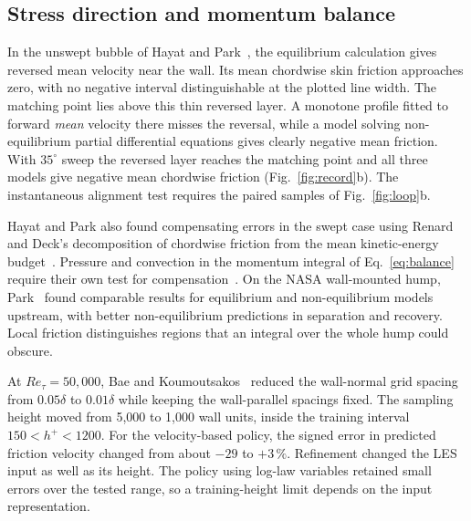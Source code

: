 \documentclass[pdflatex,sn-nature,iicol]{sn-jnl}
\begin{document}
\subsection{Stress direction and momentum balance}
In the unswept bubble of Hayat and Park~\cite{Hayat2024preprint,HayatPark2025}, the equilibrium calculation gives reversed mean velocity near the wall. Its mean chordwise skin friction approaches zero, with no negative interval distinguishable at the plotted line width. The matching point lies above this thin reversed layer. A monotone profile fitted to forward \emph{mean} velocity there misses the reversal, while a model solving non-equilibrium partial differential equations gives clearly negative mean friction. With $35^\circ$ sweep the reversed layer reaches the matching point and all three models give negative mean chordwise friction (Fig.~\ref{fig:record}b). The instantaneous alignment test requires the paired samples of Fig.~\ref{fig:loop}b.

Hayat and Park also found compensating errors in the swept case using Renard and Deck's decomposition of chordwise friction from the mean kinetic-energy budget~\cite{RenardDeck2016}. Pressure and convection in the momentum integral of Eq.~\eqref{eq:balance} require their own test for compensation~\cite{Larsson2016}. On the NASA wall-mounted hump, Park~\cite{Park2017} found comparable results for equilibrium and non-equilibrium models upstream, with better non-equilibrium predictions in separation and recovery. Local friction distinguishes regions that an integral over the whole hump could obscure.

At $Re_\tau=50{,}000$, Bae and Koumoutsakos~\cite{BaeKoumoutsakos2022} reduced the wall-normal grid spacing from $0.05\delta$ to $0.01\delta$ while keeping the wall-parallel spacings fixed. The sampling height moved from 5,000 to 1,000 wall units, inside the training interval $150<h^+<1200$. For the velocity-based policy, the signed error in predicted friction velocity changed from about $-29$ to $+3\,\%$. Refinement changed the LES input as well as its height. The policy using log-law variables retained small errors over the tested range, so a training-height limit depends on the input representation.
\end{document}
